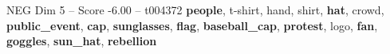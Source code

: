 \begin{textsample}{NEG Dim 5 – Score -6.00 – t004372}  \label{ex:f5_neg_029}
\textbf{people}, t-shirt, hand, shirt, \textbf{hat}, crowd, \textbf{public\_event}, \textbf{cap}, \textbf{sunglasses}, \textbf{flag}, \textbf{baseball\_cap}, \textbf{protest}, logo, \textbf{fan}, \textbf{goggles}, \textbf{sun\_hat}, \textbf{rebellion}

\end{textsample}
